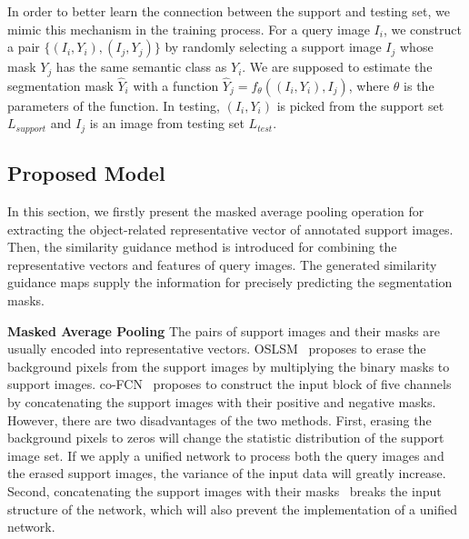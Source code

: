 \documentclass[journal]{IEEEtran}
\begin{document}
In order to better learn the connection between the support and testing set, we mimic this mechanism in the training process.
For a query image $I_i$, we construct a pair $\{(I_i, Y_i), (I_j, Y_j)\}$ by randomly selecting a support image $I_j$ whose mask $Y_j$ has the same semantic class as $Y_i$.
We are supposed to estimate the segmentation mask $\hat{Y}_i$ with a function $\hat{Y}_j = f_{\theta}((I_i,Y_i), I_j)$, where $\theta$ is the parameters of the function.
In testing, $(I_i, Y_i)$ is picked from the support set $L_{support}$ and $I_j$ is an image from testing set $L_{test}$. 

\subsection{Proposed Model}\label{model}
In this section, we firstly present the masked average pooling operation for extracting the object-related representative vector of annotated support images.
Then, the similarity guidance method is introduced for combining the representative vectors and features of query images. 
The generated similarity guidance maps supply the information for precisely predicting the segmentation masks.

\noindent \textbf{Masked Average Pooling}
The pairs of support images and their masks are usually encoded into representative vectors.
OSLSM~\cite{shaban2017one} proposes to erase the background pixels from the support images by multiplying the binary masks to support images.
co-FCN~\cite{rakelly2018conditional} proposes to construct the input block of five channels by concatenating the support images with their positive and negative masks.
However, there are two disadvantages of the two methods. 
First, erasing the background pixels to zeros will change the statistic distribution of the support image set.
If we apply a unified network to process both the query images and the erased support images, the variance of the input data will greatly increase.
Second, concatenating the support images with their masks~\cite{rakelly2018conditional} breaks the input structure of the network, which will also prevent the implementation of a unified network.
\end{document}

